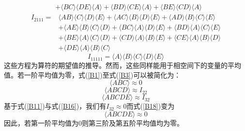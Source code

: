\begin{subappendices}
\begin{equation}
\begin{aligned}
&+\langle B C\rangle\langle D E\rangle\langle A\rangle+\langle B D\rangle\langle C E\rangle\langle A\rangle+\langle B E\rangle\langle C D\rangle\langle A\rangle
\end{aligned}\end{equation}
\begin{equation}\begin{aligned}
I_{2111}=&\langle A B\rangle\langle C\rangle\langle D\rangle\langle E\rangle+\langle A C\rangle\langle B\rangle\langle D\rangle\langle E\rangle+\langle A D\rangle\langle B\rangle\langle C\rangle\langle E\rangle \\
&+\langle A E\rangle\langle B\rangle\langle C\rangle\langle D\rangle+\langle B C\rangle\langle A\rangle\langle D\rangle\langle E\rangle+\langle B D\rangle\langle A\rangle\langle C\rangle\langle E\rangle \\
&+\langle B E\rangle\langle A\rangle\langle C\rangle\langle D\rangle+\langle C D\rangle\langle A\rangle\langle B\rangle\langle E\rangle+\langle C E\rangle\langle A\rangle\langle B\rangle\langle D\rangle \\
&+\langle D E\rangle\langle A\rangle\langle B\rangle\langle C\rangle
\end{aligned}\end{equation}
\begin{equation}I_{11111}=\langle A\rangle\langle B\rangle\langle C\rangle\langle D\rangle\langle E\rangle\end{equation}
这些方程为算符的期望值的推导。然而，这些同样能用于相空间下的变量的平均值。若一阶平均值为零，式(\ref{B1})至式(\ref{B3})可以被简化为：
\begin{equation}\langle A B C\rangle \approx 0 \label{B16}\end{equation}
\begin{equation}\langle A B C D\rangle \approx I_{22}\end{equation}
\begin{equation}\langle A B C D E\rangle \approx I_{32}\label{B18}\end{equation}
基于式(\ref{B11})与式(\ref{B16})，我们有$I_{32} \approx 0$而式(\ref{B18})变为
\begin{equation}\langle A B C D E\rangle \approx 0\end{equation}
因此，若第一阶平均值为0则第三阶及第五阶平均值均为零。



\end{subappendices}
